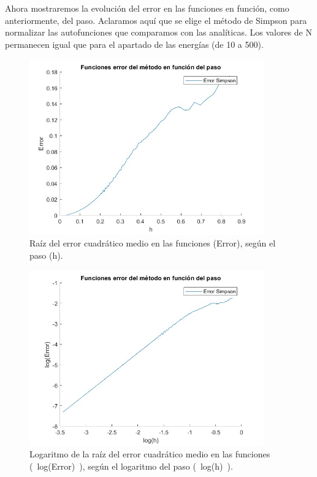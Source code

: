 \documentclass[12pt]{article}
\begin{document}
    Ahora mostraremos la evolución del error en las funciones en función, como anteriormente, del paso. Aclaramos aquí que se elige el método de Simpson para normalizar las autofunciones que comparamos con las analíticas. Los valores de N permanecen igual que para el apartado de las energías (de 10 a 500).
        
    \begin{figure}[H]
        \centering
        \includegraphics[width=0.9\textwidth]{errorfuncionsegunpaso500N.jpg}
        \caption{Raíz del error cuadrático medio en las funciones (Error), según el paso (h).}
        \end{figure} 
        
    \begin{figure}[H]
        \centering
        \includegraphics[width=0.9\textwidth]{errorfuncionsegunpasoN500log.jpg}
        \caption{Logaritmo de la raíz del error cuadrático medio en las funciones (~log(Error)~), según el  logaritmo del paso (~log(h)~).}
        \end{figure}  
        
\end{document}
